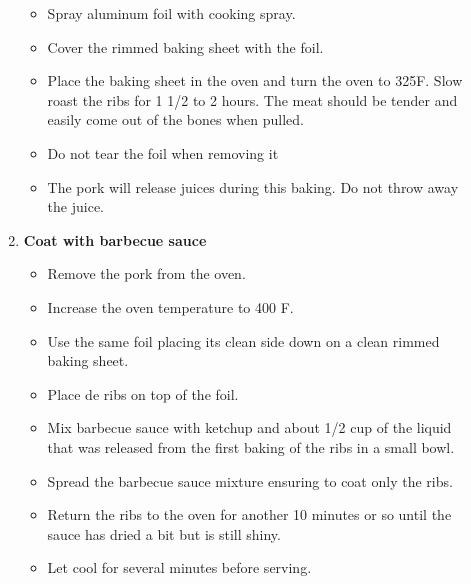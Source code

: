 \documentclass [11pt, letterpaper] {article}
\newcommand \fileName {BBQedPorkBackRibs}
\begin{document}
\begin{description}
\begin{enumerate}
		\begin{itemize}
	        \item Spray aluminum foil with cooking spray.
		\item Cover the rimmed baking sheet with the foil.
		\item Place the baking sheet in the oven and turn the oven to 325F. Slow roast the ribs for 1 1/2 to 2 hours. The meat should be tender and easily come out of the bones when pulled. 
                 \item Do not tear the foil when removing it
		\item The pork will release juices during this baking. Do not throw away the juice.
		\end{itemize}
	\item {\bf Coat with barbecue sauce}
		\begin{itemize}
		 \item Remove the pork from the oven.
		 \item Increase the oven temperature to 400 F.
		 \item Use the same foil placing its clean side down on a clean rimmed baking sheet.  
                 \item Place de ribs on top of the foil.
		\item Mix barbecue sauce with ketchup and about 1/2 cup of the liquid that was released from the first baking of the ribs in a small bowl.
		\item Spread the barbecue sauce mixture ensuring to coat only the ribs.
		\item Return the ribs to the oven for another 10 minutes or so until the sauce has dried a bit but is still shiny.
		\item Let cool for several minutes before serving. 
		\end{itemize}
     	\end{enumerate}         
\end{description}

\end{document}
